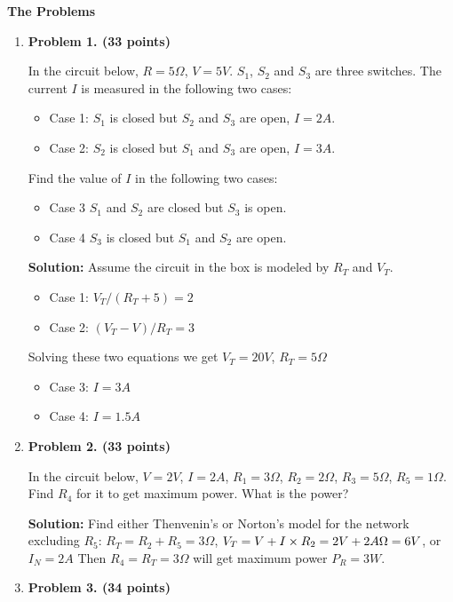 {\bf The Problems}
\begin{enumerate}


\item {\bf Problem 1. (33 points)} 

  In the circuit below, $R=5\Omega$, $V=5V$. $S_1$, $S_2$ and $S_3$
  are three switches. The current $I$ is measured in the following
  two cases:
  \begin{itemize}
  \item Case 1: $S_1$ is closed but $S_2$ and $S_3$ are open, $I=2A$.
  \item Case 2: $S_2$ is closed but $S_1$ and $S_3$ are open, $I=3A$.
  \end{itemize}
  Find the value of $I$ in the following two cases:
  \begin{itemize}
  \item Case 3 $S_1$ and $S_2$ are closed but $S_3$ is open.
  \item Case 4 $S_3$ is closed but $S_1$ and $S_2$ are open.
  \end{itemize}


  {\bf Solution:} Assume the circuit in the box is modeled by
  $R_T$ and $V_T$. 
  \begin{itemize}
  \item Case 1: $V_T/(R_T+5)=2$
  \item Case 2: $(V_T-V)/R_T=3$
  \end{itemize}
  Solving these two equations we get $V_T=20V$, $R_T=5\Omega$
  \begin{itemize}
  \item Case 3: $I=3A$
  \item Case 4: $I=1.5A$
  \end{itemize}

\item {\bf Problem 2. (33 points)} 

  In the circuit below, $V=2V$, $I=2A$, $R_1=3\Omega$, $R_2=2\Omega$,
  $R_3=5\Omega$, $R_5=1\Omega$. Find $R_4$ for it to get maximum power.
  What is the power?


  {\bf Solution:} Find either Thenvenin's or Norton's model for the 
  network excluding $R_5$: $R_T=R_2+R_5=3\Omega$, 
  $V_T=V+I\times R_2=2V+2A\time 2\Omega=6V$, or $I_N=2A$
  Then $R_4=R_T=3\Omega$ will get maximum power $P_R=3W$.

\item {\bf Problem 3. (34 points)}


\end{enumerate}
